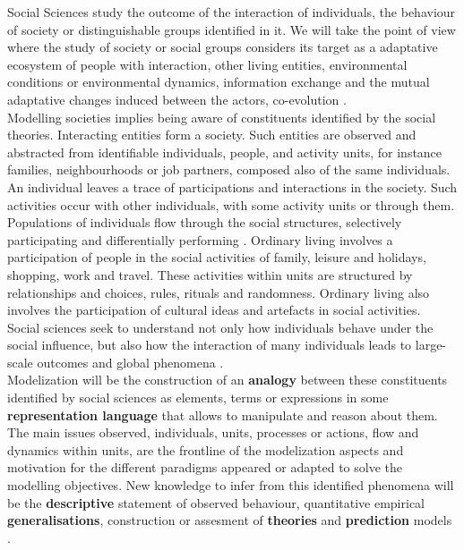 \documentclass[11pt,oneside,a4paper,openright]{report}
\begin{document}
Social Sciences study the outcome of the interaction of individuals, the behaviour of society or distinguishable
groups identified in it. We will take the point of view where the study of society or social groups considers its target as a adaptative ecosystem of people with interaction, other living entities, environmental conditions or environmental dynamics, information exchange and the mutual adaptative changes induced between the actors, co-evolution \cite{PerezAndBatten2006}.\\
Modelling societies implies being aware of constituents identified by the social theories. Interacting entities 
form a society. Such entities are observed and abstracted from identifiable individuals, people, and activity units, for instance families, neighbourhoods or job partners, composed also of the same individuals. 
An individual leaves a trace of participations and interactions in the society. Such activities occur with other
individuals, with some activity units or through them. Populations of individuals flow through the social structures, selectively participating and differentially performing \cite{GordonBurt2010}. 
Ordinary living involves a participation of people in the social activities of family, leisure and holidays, shopping, work and travel. These activities within units are structured by relationships and choices, rules, rituals and randomness. Ordinary living also involves the participation of cultural ideas and artefacts in social activities.\\
Social sciences seek to understand not only how individuals behave under the social influence, but also how the interaction of many individuals leads to large-scale outcomes and global phenomena \cite{GordonBurt2010}.\\ 
Modelization will be the construction of an \textbf{analogy} between these constituents identified by social sciences as elements, terms or expressions in some \textbf{representation language} that allows to manipulate and reason about them.\\  
The main issues observed, individuals, units, processes or actions, flow and dynamics within units, are the frontline of the modelization aspects and motivation for the different paradigms appeared or adapted to solve the modelling objectives. New knowledge to infer from this identified phenomena will be the \textbf{descriptive} statement of observed behaviour, quantitative empirical \textbf{generalisations}, construction or assesment of \textbf{theories} and \textbf{prediction} models \cite{Coleman1964}.
\end{document}
